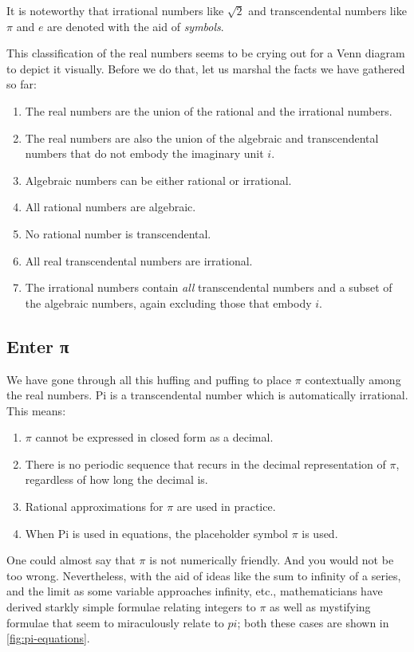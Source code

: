 \documentclass[
  a4paper,
]{article}
\begin{document}
It is noteworthy that irrational numbers like \(\sqrt{2}\) and
transcendental numbers like \(\pi\) and \(e\) are denoted with the aid
of \emph{symbols}.

This classification of the real numbers seems to be crying out for a
Venn diagram to depict it visually. Before we do that, let us marshal
the facts we have gathered so far:

\begin{enumerate}
\item
  The real numbers are the union of the rational and the irrational
  numbers.
\item
  The real numbers are also the union of the algebraic and
  transcendental numbers that do not embody the imaginary unit \(i\).
\item
  Algebraic numbers can be either rational or irrational.
\item
  All rational numbers are algebraic.
\item
  No rational number is transcendental.
\item
  All real transcendental numbers are irrational.
\item
  The irrational numbers contain \emph{all} transcendental numbers and a
  subset of the algebraic numbers, again excluding those that embody
  \(i\).
\end{enumerate}

\subsection{Enter π}\label{enter-ux3c0}

We have gone through all this huffing and puffing to place \(\pi\)
contextually among the real numbers. Pi is a transcendental number which
is automatically irrational. This means:

\begin{enumerate}
\item
  \(\pi\) cannot be expressed in closed form as a decimal.
\item
  There is no periodic sequence that recurs in the decimal
  representation of \(\pi\), regardless of how long the decimal is.
\item
  Rational approximations for \(\pi\) are used in practice.
\item
  When Pi is used in equations, the placeholder symbol \(\pi\) is used.
\end{enumerate}

One could almost say that \(\pi\) is not numerically friendly. And you
would not be too wrong. Nevertheless, with the aid of ideas like the sum
to infinity of a series, and the limit as some variable approaches
infinity, etc., mathematicians have derived starkly simple formulae
relating integers to \(\pi\) as well as mystifying formulae that seem to
miraculously relate to \(pi\); both these cases are shown in
\cref{fig:pi-equations}.
\end{document}
